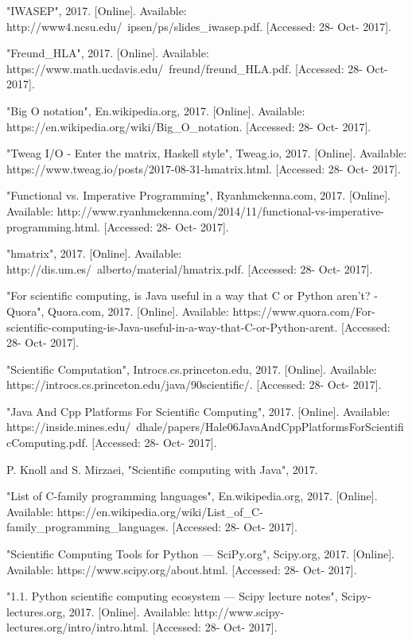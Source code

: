\documentclass[conference]{IEEEtran}
\begin{document}
\begin{thebibliography}{00}
 "IWASEP", 2017. [Online]. Available: http://www4.ncsu.edu/~ipsen/ps/slides\_iwasep.pdf. [Accessed: 28- Oct- 2017].

 "Freund\_HLA", 2017. [Online]. Available: https://www.math.ucdavis.edu/~freund/freund\_HLA.pdf. [Accessed: 28- Oct- 2017].

 "Big O notation", En.wikipedia.org, 2017. [Online]. Available: https://en.wikipedia.org/wiki/Big\_O\_notation. [Accessed: 28- Oct- 2017].

 "Tweag I/O - Enter the matrix, Haskell style", Tweag.io, 2017. [Online]. Available: https://www.tweag.io/posts/2017-08-31-hmatrix.html. [Accessed: 28- Oct- 2017].

 "Functional vs. Imperative Programming", Ryanhmckenna.com, 2017. [Online]. Available: http://www.ryanhmckenna.com/2014/11/functional-vs-imperative-programming.html. [Accessed: 28- Oct- 2017].

 "hmatrix", 2017. [Online]. Available: http://dis.um.es/~alberto/material/hmatrix.pdf. [Accessed: 28- Oct- 2017].

 "For scientific computing, is Java useful in a way that C or Python aren't? - Quora", Quora.com, 2017. [Online]. Available: https://www.quora.com/For-scientific-computing-is-Java-useful-in-a-way-that-C-or-Python-arent. [Accessed: 28- Oct- 2017].

 "Scientific Computation", Introcs.cs.princeton.edu, 2017. [Online]. Available: https://introcs.cs.princeton.edu/java/90scientific/. [Accessed: 28- Oct- 2017].

 "Java And Cpp Platforms For Scientific Computing", 2017. [Online]. Available: https://inside.mines.edu/~dhale/papers/Hale06JavaAndCppPlatformsForScientificComputing.pdf. [Accessed: 28- Oct- 2017].

 P. Knoll and S. Mirzaei, "Scientific computing with Java", 2017.

 "List of C-family programming languages", En.wikipedia.org, 2017. [Online]. Available: https://en.wikipedia.org/wiki/List\_of\_C-family\_programming\_languages. [Accessed: 28- Oct- 2017].

 "Scientific Computing Tools for Python — SciPy.org", Scipy.org, 2017. [Online]. Available: https://www.scipy.org/about.html. [Accessed: 28- Oct- 2017].

 "1.1. Python scientific computing ecosystem — Scipy lecture notes", Scipy-lectures.org, 2017. [Online]. Available: http://www.scipy-lectures.org/intro/intro.html. [Accessed: 28- Oct- 2017].


\end{thebibliography}
\end{document}
